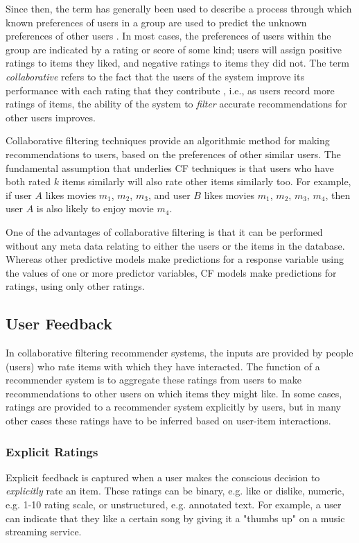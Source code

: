 Since then, the term has generally been used to describe a process through which known preferences of users in a group are used to predict the unknown preferences of other users \parencite{cf_1.1}. In most cases, the preferences of users within the group are indicated by a rating or score of some kind; users will assign positive ratings to items they liked, and negative ratings to items they did not. The term \textit{collaborative} refers to the fact that the users of the system improve its performance with each rating that they contribute \parencite{cf_1.2_eigentaste}, i.e., as users record more ratings of items, the ability of the system to \textit{filter} accurate recommendations for other users improves. 

Collaborative filtering techniques provide an algorithmic method for making recommendations to users, based on the preferences of other similar users. The fundamental assumption that underlies CF techniques is that users who have both rated $k$ items similarly will also rate other items similarly too. For example, if user $A$ likes movies $m_1$, $m_2$, $m_3$, and user $B$ likes movies $m_1$, $m_2$, $m_3$, $m_4$, then user $A$ is also likely to enjoy movie $m_4$.

One of the advantages of collaborative filtering is that it can be performed without any meta data relating to either the users or the items in the database. Whereas other predictive models make predictions for a response variable using the values of one or more predictor variables, CF models make predictions for ratings, using only other ratings.

\subsection{User Feedback}
 In collaborative filtering recommender systems, the inputs are provided by people (users) who rate items with which they have interacted. The function of a recommender system is to aggregate these ratings from users to make recommendations to other users on which items they might like. In some cases, ratings are provided to a recommender system explicitly by users, but in many other cases these ratings have to be inferred based on user-item interactions. 

\subsubsection{Explicit Ratings}
Explicit feedback is captured when a user makes the conscious decision to \textit{explicitly} rate an item. These ratings can be binary, e.g. like or dislike, numeric, e.g. 1-10 rating scale, or unstructured, e.g. annotated text. For example, a user can indicate that they like a certain song by giving it a "thumbs up" on a music streaming service.

